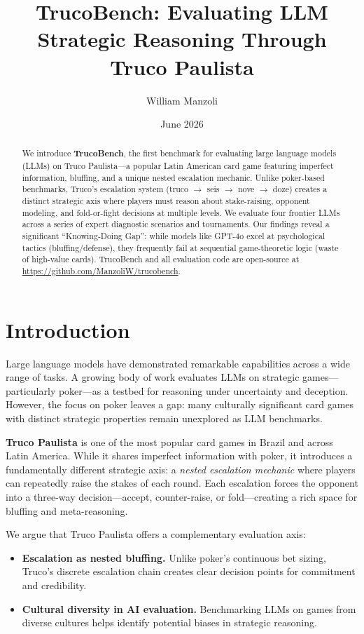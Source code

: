 \documentclass[11pt]{article}
\title{TrucoBench: Evaluating LLM Strategic Reasoning Through Truco Paulista}
\author{William Manzoli}
\date{June 2026}
\begin{document}
\maketitle

\begin{abstract}
We introduce \textbf{TrucoBench}, the first benchmark for evaluating large language models (LLMs) on Truco Paulista---a popular Latin American card game featuring imperfect information, bluffing, and a unique nested escalation mechanic. Unlike poker-based benchmarks, Truco's escalation system (truco $\to$ seis $\to$ nove $\to$ doze) creates a distinct strategic axis where players must reason about stake-raising, opponent modeling, and fold-or-fight decisions at multiple levels. We evaluate four frontier LLMs across a series of expert diagnostic scenarios and tournaments. Our findings reveal a significant ``Knowing-Doing Gap'': while models like GPT-4o excel at psychological tactics (bluffing/defense), they frequently fail at sequential game-theoretic logic (waste of high-value cards). TrucoBench and all evaluation code are open-source at \url{https://github.com/ManzoliW/trucobench}.
\end{abstract}

\section{Introduction}

Large language models have demonstrated remarkable capabilities across a wide range of tasks. A growing body of work evaluates LLMs on strategic games---particularly poker---as a testbed for reasoning under uncertainty and deception. However, the focus on poker leaves a gap: many culturally significant card games with distinct strategic properties remain unexplored as LLM benchmarks.

\textbf{Truco Paulista} is one of the most popular card games in Brazil and across Latin America. While it shares imperfect information with poker, it introduces a fundamentally different strategic axis: a \emph{nested escalation mechanic} where players can repeatedly raise the stakes of each round. Each escalation forces the opponent into a three-way decision---accept, counter-raise, or fold---creating a rich space for bluffing and meta-reasoning.

We argue that Truco Paulista offers a complementary evaluation axis:
\begin{itemize}
    \item \textbf{Escalation as nested bluffing.} Unlike poker's continuous bet sizing, Truco's discrete escalation chain creates clear decision points for commitment and credibility.
    \item \textbf{Cultural diversity in AI evaluation.} Benchmarking LLMs on games from diverse cultures helps identify potential biases in strategic reasoning.
\end{itemize}
\end{document}
